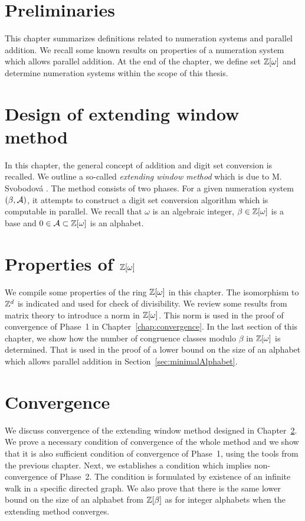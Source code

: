 \documentclass[11pt,a4paper]{report}	%
\theoremstyle{definition}
\begin{document}
\chapter{Preliminaries}

This chapter summarizes definitions related to numeration systems and parallel addition. We recall some known results on properties of a numeration system which allows parallel addition. At the end of the chapter, we define set $\mathbb{Z}[\omega]$ and determine numeration systems within the scope of this thesis.
	




\chapter{Design of extending window method}
\label{chap:ewm}
In this chapter, the general concept of addition and digit set conversion is recalled. We outline a so-called \emph{extending window method} which is due to M. Svobodov\'a \cite{milena}. The method consists of two phases. For a given numeration system $(\beta,\mathcal{A})$, it attempts to construct a digit set conversion algorithm which is computable in parallel. We recall that $\omega$ is an algebraic integer, $\beta \in \mathbb{Z}[\omega]$ is a base and $0\in\mathcal{A}\subset\mathbb{Z}[\omega]$ is an alphabet. 


	

\chapter{\texorpdfstring{Properties of $\mathbb{Z}[\omega]$}{Properties of Z[omega]}}
We compile some properties  of the ring $\mathbb{Z}[\omega]$ in this chapter. The isomorphism to $\mathbb{Z}^d$ is indicated and used for check of divisibility.  We review some results from matrix theory to introduce a norm in $\mathbb{Z}[\omega]$. This norm is used in the proof of convergence of Phase~1 in Chapter~\ref{chap:convergence}. In the last section of this chapter, we show how the number of congruence classes modulo $\beta$ in $\mathbb{Z}[\omega]$ is determined. That is used in the proof of a lower bound on the size of an alphabet which allows parallel addition in Section~\ref{sec:minimalAlphabet}.
	
	
		
	
\chapter{Convergence}
We discuss convergence of the extending window method designed in Chapter~\ref{chap:ewm}. We prove a necessary condition of convergence of the whole method and we show that it is also sufficient condition of convergence of Phase~1, using the tools from the previous chapter. Next, we establishes a condition which implies non-convergence of Phase~2. The condition is formulated by existence of an infinite walk in a specific directed graph. We also prove that there is the same lower bound on the size of an alphabet from $\mathbb{Z}[\beta]$ as for integer alphabets when the extending method converges.
\label{chap:convergence}
\end{document}

